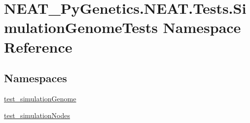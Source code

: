 \hypertarget{namespaceNEAT__PyGenetics_1_1NEAT_1_1Tests_1_1SimulationGenomeTests}{}\section{N\+E\+A\+T\+\_\+\+Py\+Genetics.\+N\+E\+A\+T.\+Tests.\+Simulation\+Genome\+Tests Namespace Reference}
\label{namespaceNEAT__PyGenetics_1_1NEAT_1_1Tests_1_1SimulationGenomeTests}
\subsection*{Namespaces}
\begin{DoxyCompactItemize}
\item 
 \hyperlink{namespaceNEAT__PyGenetics_1_1NEAT_1_1Tests_1_1SimulationGenomeTests_1_1test__simulationGenome}{test\+\_\+simulation\+Genome}
\item 
 \hyperlink{namespaceNEAT__PyGenetics_1_1NEAT_1_1Tests_1_1SimulationGenomeTests_1_1test__simulationNodes}{test\+\_\+simulation\+Nodes}
\end{DoxyCompactItemize}
